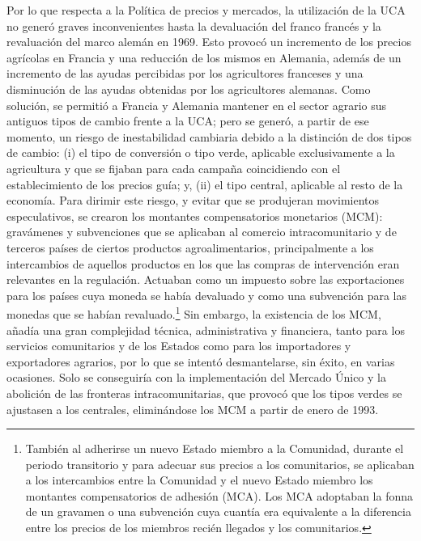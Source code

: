 \documentclass[10pt,a4paper]{article}
\begin{document}
Por lo que respecta a la Política de precios y mercados, la utilización de la UCA no generó graves inconvenientes hasta la devaluación del franco francés y la revaluación del marco alemán en 1969. Esto provocó un incremento de los precios agrícolas en Francia y una reducción de los mismos en Alemania, además de un incremento de las ayudas percibidas por los agricultores franceses y una disminución de las ayudas obtenidas por los agricultores alemanas. Como solución, se permitió a Francia y Alemania mantener en el sector agrario sus antiguos tipos de cambio frente a la UCA; pero se generó, a partir de ese momento, un riesgo de inestabilidad cambiaria debido a la distinción de dos tipos de cambio: (i) el tipo de conversión o tipo verde, aplicable exclusivamente a la agricultura y que se fijaban para cada campaña coincidiendo con el establecimiento de los precios guía; y, (ii) el tipo central, aplicable al resto de la economía. Para dirimir este riesgo, y evitar que se produjeran movimientos especulativos, se crearon los montantes compensatorios monetarios (MCM): gravámenes y subvenciones que se aplicaban al comercio intracomunitario y de terceros países de ciertos productos agroalimentarios, principalmente a los intercambios de aquellos productos en los que las compras de intervención eran relevantes en la regulación. Actuaban como un impuesto sobre las exportaciones para los países cuya moneda se había devaluado y como una subvención para las monedas que se habían revaluado.\footnote{%
    También al adherirse un nuevo Estado miembro a la Comunidad, durante el periodo transitorio y para adecuar sus precios a los comunitarios, se aplicaban a los intercambios entre la Comunidad y el nuevo Estado miembro los montantes compensatorios de adhesión (MCA). Los MCA adoptaban la fonna de un gravamen o una subvención cuya cuantía era equivalente a la diferencia entre los precios de los miembros recién llegados y los comunitarios.
} Sin embargo, la existencia de los MCM, añadía una gran complejidad técnica, administrativa y financiera, tanto para los servicios comunitarios y de los Estados como para los importadores y exportadores agrarios, por lo que se intentó desmantelarse, sin éxito, en varias ocasiones. Solo se conseguiría con la implementación del Mercado Único y la abolición de las fronteras intracomunitarias, que provocó que los tipos verdes se ajustasen a los centrales, eliminándose los MCM a partir de enero de 1993.
\end{document}
